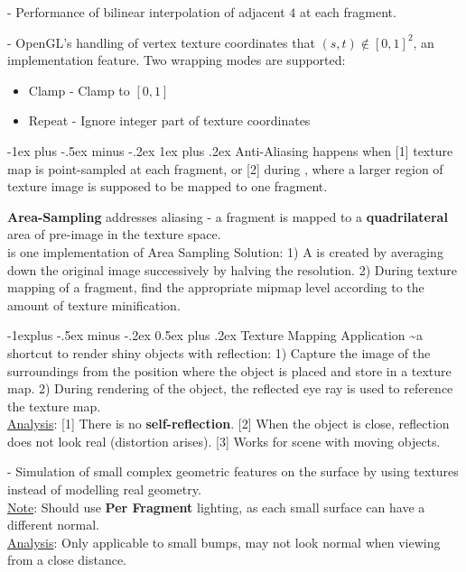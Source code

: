 \documentclass[10pt,landscape,letterpaper]{article}
\makeatletter
\renewcommand{\subsection}{\@startsection{subsection}{2}{0mm}%
                                {-1explus -.5ex minus -.2ex}%
                                {0.5ex plus .2ex}%
                                {\sffamily\normalsize\itshape}}
\renewcommand{\subsubsection}{\@startsection{subsubsection}{3}{0mm}%
                                {-1ex plus -.5ex minus -.2ex}%
                                {1ex plus .2ex}%
                                {\normalfont\small\itshape}}
\makeatother
\begin{document}
\begin{multicols}{3}
 - Performance of bilinear interpolation of adjacent $4$  at each fragment.

\medskip

 - OpenGL's handling of vertex texture coordinates that $(s, t) \not\in [0, 1]^2$, an implementation feature. Two wrapping modes are supported:
\begin{itemize}
    \item Clamp - Clamp to $[0, 1]$
    \item Repeat - Ignore integer part of texture coordinates
\end{itemize}


\subsubsection{Anti-Aliasing}
 happens when [1] texture map is point-sampled at each fragment, or [2] during , where a larger region of texture image is supposed to be mapped to one fragment. 

\medskip

\textbf{Area-Sampling} addresses aliasing - a fragment is mapped to a \textbf{quadrilateral} area of pre-image in the texture space.
\\
 is one implementation of Area Sampling Solution: 1) A  is created by averaging down the original image successively by halving the resolution. 2) During texture mapping of a fragment, find the appropriate mipmap level according to the amount of texture minification.


\subsection{Texture Mapping Application}
 \textasciitilde a shortcut to render shiny objects with reflection: 1) Capture the image of the surroundings from the position where the object is placed and store in a texture map. 2) During rendering of the object, the reflected eye ray is used to reference the texture map.
\\
\underline{Analysis}: [1] There is no \textbf{self-reflection}. [2] When the object is close, reflection does not look real (distortion arises). [3] Works for scene with moving objects. 

\medskip

 - Simulation of small complex geometric features on the surface by using textures instead of modelling real geometry.
\\
\underline{Note}: Should use \textbf{Per Fragment} lighting, as each small surface can have a different normal. 
\\
\underline{Analysis}: Only applicable to small bumps, may not look normal  when viewing from a close distance.


\end{multicols}
\end{document}

